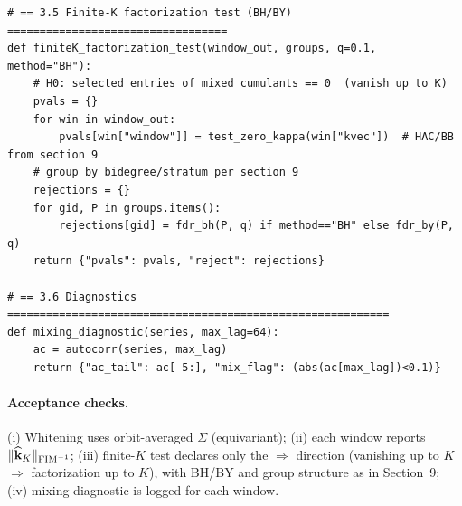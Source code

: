 \begin{lstlisting}
# == 3.5 Finite-K factorization test (BH/BY) ==================================
def finiteK_factorization_test(window_out, groups, q=0.1, method="BH"):
    # H0: selected entries of mixed cumulants == 0  (vanish up to K)
    pvals = {}
    for win in window_out:
        pvals[win["window"]] = test_zero_kappa(win["kvec"])  # HAC/BB from section 9
    # group by bidegree/stratum per section 9
    rejections = {}
    for gid, P in groups.items():
        rejections[gid] = fdr_bh(P, q) if method=="BH" else fdr_by(P, q)
    return {"pvals": pvals, "reject": rejections}

# == 3.6 Diagnostics ===========================================================
def mixing_diagnostic(series, max_lag=64):
    ac = autocorr(series, max_lag)
    return {"ac_tail": ac[-5:], "mix_flag": (abs(ac[max_lag])<0.1)}
\end{lstlisting}

\paragraph{Acceptance checks.}
(i) Whitening uses orbit-averaged $\Sigma$ (equivariant);  
(ii) each window reports $\|\widehat{\mathbf k}_K\|_{\mathrm{FIM}^{-1}}$;  
(iii) finite-$K$ test declares only the $\Rightarrow$ direction (vanishing up to $K$ $\Rightarrow$ factorization up to $K$), with BH/BY and group structure as in Section~9;  
(iv) mixing diagnostic is logged for each window.



